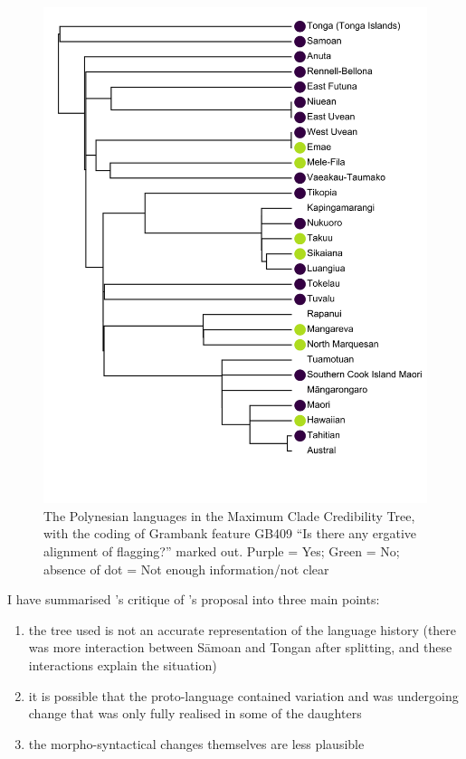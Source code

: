 \documentclass[12pt,letterpaper]{article}
\begin{document}
\begin{figure}[p]
\centering
\includegraphics[width=16cm]{illustrations/plots_from_R//tree_plots/poly_tree_example.png}
\caption{{The Polynesian languages in the \citet{grayetal_2009} Maximum Clade Credibility Tree, with the coding of Grambank feature GB409 ``Is there any ergative alignment of flagging?'' marked out. Purple = Yes; Green = No; absence of dot = Not enough information/not clear}}
\label{poly_GB409_tree}
\end{figure} 

I have summarised \citeauthor{chung1978}'s critique of \citeauthor{clark1973aspects}'s proposal into three main points:
 
\begin{enumerate}[label=(\alph*)]
\item the tree used is not an accurate representation of the language history (there was more interaction between S\={a}moan and Tongan after splitting, and these interactions explain the situation)
\item it is possible that the proto-language contained variation and was undergoing change that was only fully realised in some of the daughters
\item the morpho-syntactical changes themselves are less plausible
\end{enumerate}
\end{document}
